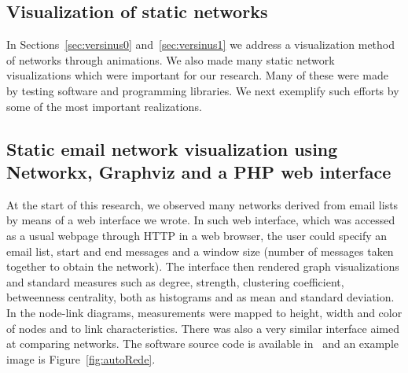 \begin{apendicesenv}
	\section{Visualization of static networks}
	In Sections~\ref{sec:versinus0} and~\ref{sec:versinus1} we address a visualization method of networks through animations.
	We also made many static network visualizations which were important for our research.
	Many of these were made by testing software and programming libraries.
	We next exemplify such efforts by some of the most important realizations.

	\subsection{Static email network visualization using Networkx, Graphviz and a PHP web interface}\label{sec:autoRede}
	At the start of this research, we observed many networks derived from email lists
	by means of a web interface we wrote.
	In such web interface, which was accessed as a usual webpage through HTTP in a web browser, 
	the user could specify an email list, start and end messages and a window size (number of messages taken together to obtain the network).
	The interface then rendered graph visualizations and standard measures such as degree, strength, clustering coefficient, betweenness centrality, both as histograms and as mean and standard deviation.
	In the node-link diagrams, measurements were mapped to height, width and color of nodes and to link characteristics.
	There was also a very similar interface aimed at comparing networks.
	The software source code is available in~\cite{autoRede} and an example image is Figure~\ref{fig:autoRede}.
\begin{figure}[h!]
\begin{center}

\end{center}
\end{figure}
\end{apendicesenv}
